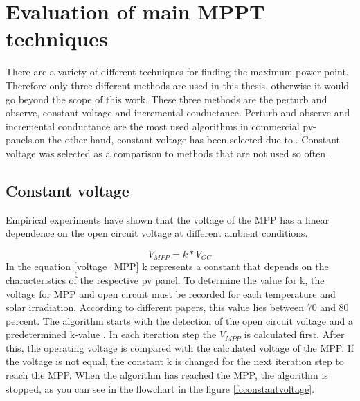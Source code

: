 \section{Evaluation of main MPPT techniques\label{MPPTalgo}}

There are a variety of different techniques for finding the maximum power point. Therefore only three different methods are used in this thesis, otherwise it would go beyond the scope of this work. These three methods are the perturb and observe, constant voltage and incremental conductance. Perturb and observe and incremental conductance are the most used algorithms in commercial pv-panels.on the other hand, constant voltage has been selected due to..  Constant voltage was selected as a comparison to methods that are not used so often . 

\subsection{Constant voltage}
Empirical experiments have shown that the voltage of the MPP has a linear dependence on the open circuit voltage at different ambient conditions.

\begin{equation} \label{voltage_MPP}
V_{MPP} = k * V_{OC}	
\end{equation} 
In the equation \ref{voltage_MPP} k represents a constant that depends on the characteristics of the respective pv panel. To determine the value for k, the voltage for MPP and open circuit must be recorded for each temperature and solar irradiation. According to different papers, this value lies between 70 and 80 percent. The algorithm starts with the detection of the open circuit voltage and a predetermined k-value . In each iteration step the $V_{MPP}$ is calculated first. After this, the operating voltage is compared with the calculated voltage of the MPP. If the voltage is not equal, the constant k is changed for the next iteration step to reach the MPP. When the algorithm has reached the MPP, the algorithm is stopped, as you can see in the flowchart in the figure \ref{fcconstantvoltage}\cite{}. 


